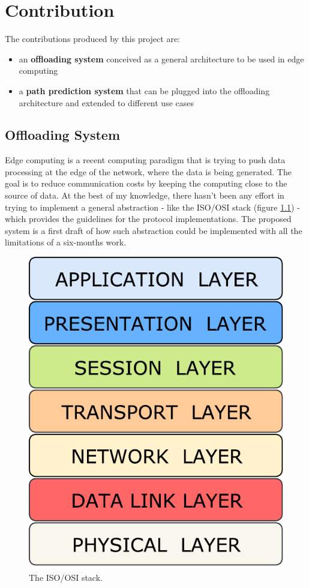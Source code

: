 \chapter{Contribution}
The contributions produced by this project are:
\begin{itemize}
\item an \textbf{offloading system} conceived as a general architecture to be used in edge computing
\item a \textbf{path prediction system} that can be plugged into the offloading architecture and extended to different use cases
\end{itemize}

\section{Offloading System}
Edge computing is a recent computing paradigm that is trying to push data processing at the edge of the network, where the data is being generated. The goal is to reduce communication costs by keeping the computing close to the source of data. At the best of my knowledge, there hasn't been any effort in trying to implement a general abstraction - like the ISO/OSI stack (figure \ref{fig:iso_stack}) - which provides the guidelines for the protocol implementations. The proposed system is a first draft of how such abstraction could be implemented with all the limitations of a six-months work.
\begin{figure}[ht]
\includegraphics[width=\textwidth]{img/osi}
\caption{The ISO/OSI stack.}
\label{fig:iso_stack}
\end{figure}

